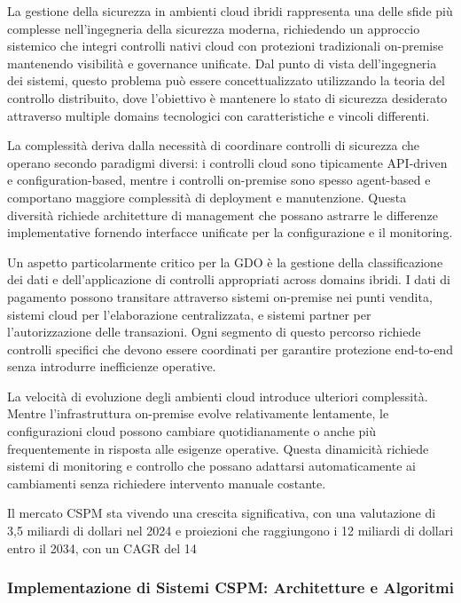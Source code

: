 {La gestione della sicurezza in ambienti cloud ibridi rappresenta una delle sfide più complesse nell'ingegneria della sicurezza moderna, richiedendo un approccio sistemico che integri controlli nativi cloud con protezioni tradizionali on-premise mantenendo visibilità e governance unificate. Dal punto di vista dell'ingegneria dei sistemi, questo problema può essere concettualizzato utilizzando la teoria del controllo distribuito, dove l'obiettivo è mantenere lo stato di sicurezza desiderato attraverso multiple domains tecnologici con caratteristiche e vincoli differenti.

La complessità deriva dalla necessità di coordinare controlli di sicurezza che operano secondo paradigmi diversi: i controlli cloud sono tipicamente API-driven e configuration-based, mentre i controlli on-premise sono spesso agent-based e comportano maggiore complessità di deployment e manutenzione. Questa diversità richiede architetture di management che possano astrarre le differenze implementative fornendo interfacce unificate per la configurazione e il monitoring.

Un aspetto particolarmente critico per la GDO è la gestione della classificazione dei dati e dell'applicazione di controlli appropriati across domains ibridi. I dati di pagamento possono transitare attraverso sistemi on-premise nei punti vendita, sistemi cloud per l'elaborazione centralizzata, e sistemi partner per l'autorizzazione delle transazioni. Ogni segmento di questo percorso richiede controlli specifici che devono essere coordinati per garantire protezione end-to-end senza introdurre inefficienze operative.

La velocità di evoluzione degli ambienti cloud introduce ulteriori complessità. Mentre l'infrastruttura on-premise evolve relativamente lentamente, le configurazioni cloud possono cambiare quotidianamente o anche più frequentemente in risposta alle esigenze operative. Questa dinamicità richiede sistemi di monitoring e controllo che possano adattarsi automaticamente ai cambiamenti senza richiedere intervento manuale costante.

Il mercato CSPM sta vivendo una crescita significativa, con una valutazione di 3,5 miliardi di dollari nel 2024 e proiezioni che raggiungono i 12 miliardi di dollari entro il 2034, con un CAGR del 14%

\subsubsection{Implementazione di Sistemi CSPM: Architetture e Algoritmi}

}
